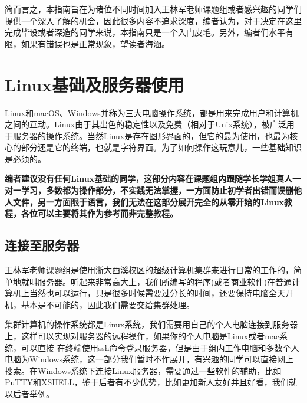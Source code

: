 \documentclass[12pt,a4paper,openany,twoside]{book}
\numberwithin{equation}{section}
\begin{document}
  简而言之，本指南旨在为诸位不同时间加入王林军老师课题组或者感兴趣的同学们提供一个深入了解的机会，因此很多内容不追求深度，编者认为，对于决定在这里完成毕设或者深造的同学来说，本指南只是一个入门皮毛。另外，编者们水平有限，如果有错误也是正常现象，望读者海涵。

    \chapter{Linux基础及服务器使用}
    Linux和macOS、Windows并称为三大电脑操作系统，都是用来完成用户和计算机之间的互动。Linux由于其出色的稳定性以及免费（相对于Unix系统），被广泛用于服务器的操作系统。当然Linux是存在图形界面的，但它的最为使用，也最为核心的部分还是它的终端，也就是字符界面。为了如何操作这玩意儿，一些基础知识是必须的。

    {\color{red}\textbf{编者建议没有任何Linux基础的同学，这部分内容在课题组内跟随学长学姐真人一对一学习，多数都为操作部分，不实践无法掌握，一方面防止初学者出错而误删他人文件，另一方面限于语言，我们无法在这部分展开完全的从零开始的Linux教程，各位可以主要将其作为参考而非完整教程。}}

    \section{连接至服务器}
    王林军老师课题组是使用浙大西溪校区的超级计算机集群来进行日常的工作的，简单地就叫服务器。听起来非常高大上，我们所编写的程序(或者商业软件)在普通计算机上当然也可以运行，只是很多时候需要过分长的时间，还要保持电脑全天开机，基本是不可能的，因此我们需要交给集群处理。

    集群计算机的操作系统都是Linux系统，我们需要用自己的个人电脑连接到服务器上，这样可以实现对服务器的远程操作，如果你的个人电脑是Linux或者mac系统，可以直接
    在终端使用ssh命令登录服务器，但是由于组内工作电脑和多数个人电脑为Windows系统，这一部分我们暂时不作展开，有兴趣的同学可以直接网上搜索。在Windows系统下连接Linux服务器，需要通过一些软件的辅助，比如PuTTY和XSHELL，鉴于后者有不少优势，比如更加新人友好\sout{并且好看}，我们就以后者举例。
\end{document}
